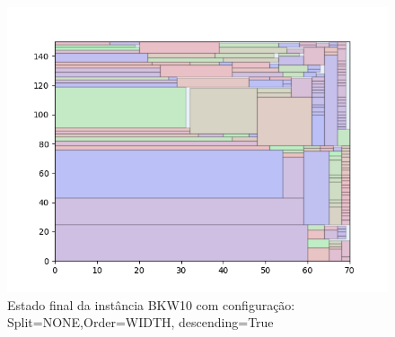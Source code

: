 \begin{figure}[H]
    \centering
    \caption[]{Estado final da instância BKW10 com configuração: Split=NONE,Order=WIDTH, descending=True}
    \label{fig:bkw10-none-width-true}
    \includegraphics[scale=0.5]{output/figures/bkw/bkw10/none/width/true/000}
\end{figure}